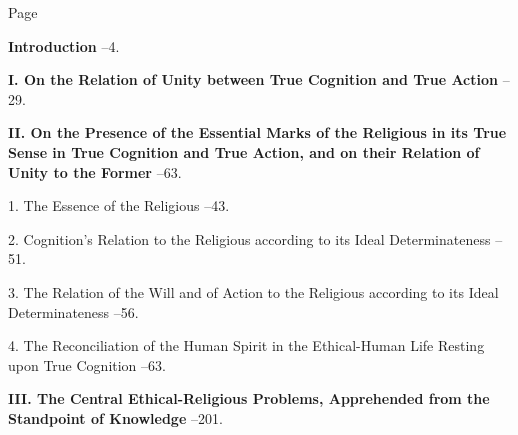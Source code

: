 \documentclass[12pt,a4paper]{book}
\begin{document}
\begingroup
{}
\begin{list}{}{%
  \setlength{\leftmargin}{2.2em}\setlength{\itemindent}{-2.2em}%
  \setlength{\itemsep}{2pt}\setlength{\parsep}{0pt}}

\item[] \hfill Page

\item \textbf{Introduction} --4.

\item \textbf{I. On the Relation of Unity between True Cognition and True
  Action} --29.

\item \textbf{II. On the Presence of the Essential Marks of the Religious
  in its True Sense in True Cognition and True Action, and on their
  Relation of Unity to the Former} --63.

\item[] \hspace{1.2em} 1. The Essence of the Religious --43.
\item[] \hspace{1.2em} 2. Cognition's Relation to the Religious according
  to its Ideal Determinateness --51.
\item[] \hspace{1.2em} 3. The Relation of the Will and of Action to the
  Religious according to its Ideal Determinateness --56.
\item[] \hspace{1.2em} 4. The Reconciliation of the Human Spirit in the
  Ethical-Human Life Resting upon True Cognition --63.

\item \textbf{III. The Central Ethical-Religious Problems, Apprehended
  from the Standpoint of Knowledge} --201.


\end{list}
\end{document}

